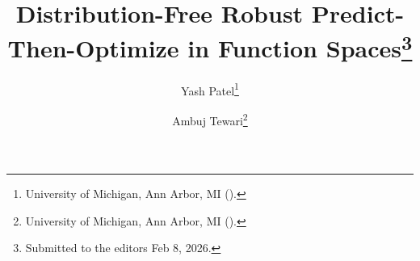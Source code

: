 

\usepackage{lipsum}
\usepackage{amsfonts}
\usepackage{graphicx}
\usepackage{epstopdf}
\usepackage{algorithm}      %
\usepackage{algpseudocode}  %
\usepackage{mathtools}
\usepackage{booktabs}
\usepackage{subcaption}
\usepackage[scr=rsfs]{mathalpha}
\usepackage{multirow}
\usepackage{bbm}
\usepackage{longtable,booktabs}
\ifpdf
\else
\fi

\usepackage{outlines}
\usepackage{enumitem}

\newcommand{\creflastconjunction}{, and~}



\title{Distribution-Free Robust Predict-Then-Optimize in Function Spaces\thanks{Submitted to the editors Feb 8, 2026.
}}

\author{Yash Patel\thanks{University of Michigan, Ann Arbor, MI 
  ().}
\and Ambuj Tewari\thanks{University of Michigan, Ann Arbor, MI 
  ().}}

\usepackage{subcaption} %

\usepackage{amsopn}
\DeclareMathOperator{\diag}{diag}
\DeclareMathOperator*{\argmax}{arg\,max}
\DeclareMathOperator*{\argmin}{arg\,min}
\DeclareMathOperator{\logit}{logit}
\DeclarePairedDelimiter{\ceil}{\lceil}{\rceil}
\DeclarePairedDelimiter\floor{\lfloor}{\rfloor}
\newcommand{\indep}{\perp \!\!\! \perp}

